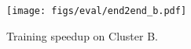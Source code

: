 \begin{figure}[t!]
    \centering
    \texttt{[image: figs/eval/end2end\_b.pdf]}
    \caption{Training speedup on Cluster B.}
    \label{fig:end2end_b}
\end{figure}
